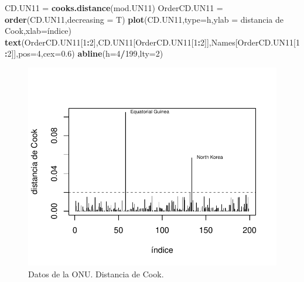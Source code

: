 \documentclass[
]{article}
\newenvironment{Shaded}{\begin{snugshade}}{\end{snugshade}}
\newcommand{\AttributeTok}[1]{\textcolor[rgb]{0.13,0.29,0.53}{#1}}
\newcommand{\DecValTok}[1]{\textcolor[rgb]{0.00,0.00,0.81}{#1}}
\newcommand{\FloatTok}[1]{\textcolor[rgb]{0.00,0.00,0.81}{#1}}
\newcommand{\FunctionTok}[1]{\textcolor[rgb]{0.13,0.29,0.53}{\textbf{#1}}}
\newcommand{\NormalTok}[1]{#1}
\newcommand{\OtherTok}[1]{\textcolor[rgb]{0.56,0.35,0.01}{#1}}
\newcommand{\SpecialCharTok}[1]{\textcolor[rgb]{0.81,0.36,0.00}{\textbf{#1}}}
\newcommand{\StringTok}[1]{\textcolor[rgb]{0.31,0.60,0.02}{#1}}
\begin{document}
\begin{Shaded}
\begin{Highlighting}[]
\NormalTok{CD.UN11 }\OtherTok{=} \FunctionTok{cooks.distance}\NormalTok{(mod.UN11)}
\NormalTok{OrderCD.UN11 }\OtherTok{=} \FunctionTok{order}\NormalTok{(CD.UN11,}\AttributeTok{decreasing =}\NormalTok{ T)}
\FunctionTok{plot}\NormalTok{(CD.UN11,}\AttributeTok{type=}\StringTok{\textquotesingle{}h\textquotesingle{}}\NormalTok{,}\AttributeTok{ylab =} \StringTok{\textquotesingle{}distancia de Cook\textquotesingle{}}\NormalTok{,}\AttributeTok{xlab=}\StringTok{\textquotesingle{}índice\textquotesingle{}}\NormalTok{)}
\FunctionTok{text}\NormalTok{(OrderCD.UN11[}\DecValTok{1}\SpecialCharTok{:}\DecValTok{2}\NormalTok{],CD.UN11[OrderCD.UN11[}\DecValTok{1}\SpecialCharTok{:}\DecValTok{2}\NormalTok{]],Names[OrderCD.UN11[}\DecValTok{1}\SpecialCharTok{:}\DecValTok{2}\NormalTok{]],}\AttributeTok{pos=}\DecValTok{4}\NormalTok{,}\AttributeTok{cex=}\FloatTok{0.6}\NormalTok{)}
\FunctionTok{abline}\NormalTok{(}\AttributeTok{h=}\DecValTok{4}\SpecialCharTok{/}\DecValTok{199}\NormalTok{,}\AttributeTok{lty=}\DecValTok{2}\NormalTok{)}
\end{Highlighting}
\end{Shaded}

\begin{figure}

{\centering \includegraphics{MLG1_files/figure-latex/Un11Cook-1} 

}

\caption{Datos de la ONU. Distancia de Cook.}\label{fig:Un11Cook}
\end{figure}
\end{document}
